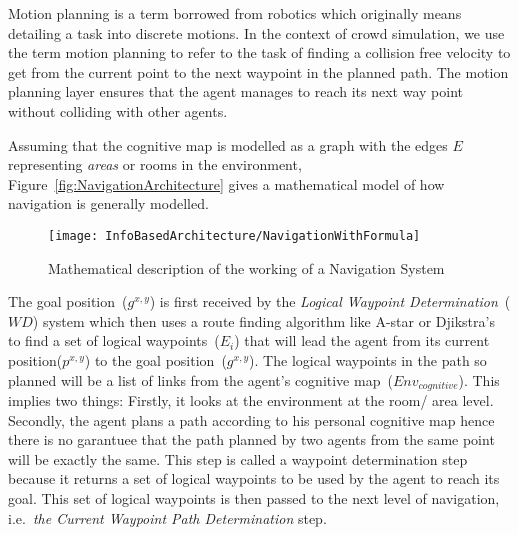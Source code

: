     Motion planning is a term borrowed from robotics which originally means detailing a task into discrete motions. In the context of crowd simulation, we use the term motion planning to refer to the task of finding a collision free velocity to get from the current point to the next waypoint in the planned path. The motion planning layer ensures that the agent manages to reach its next way point without colliding with other agents.

    Assuming that the cognitive map is modelled as a graph with the edges $E$ representing \emph{areas} or rooms in the environment, Figure~\ref{fig:NavigationArchitecture} gives a mathematical model of how navigation is generally modelled.



    \begin{figure}[!tb]
    \centering
    \texttt{[image: InfoBasedArchitecture/NavigationWithFormula]}
    \caption[Detailed Navigation Model]{Mathematical description of the working of a Navigation System}
    \label{fig:detailedNavigationModule}
    \end{figure}

    The goal position~($g^{x,y}$) is first received by the \emph{Logical Waypoint Determination}~($WD$) system which then uses a route finding algorithm like A-star or Djikstra's to find a set of logical waypoints~($E_i$) that will lead the agent from its current position($p^{x,y}$) to the goal position~($g^{x,y}$). The logical waypoints in the path so planned will be a list of links from the agent's cognitive map~($Env_{cognitive}$). This implies two things: Firstly, it looks at the environment at the room/ area level. Secondly, the agent plans a path according to his personal cognitive map hence there is no garantuee that the path planned by two agents from the same point will be exactly the same. This step is called a waypoint determination step because it returns a set of logical waypoints to be used by the agent to reach its goal. This set of logical waypoints is then passed to the next level of navigation, i.e.\ \emph{the Current Waypoint Path Determination} step.

